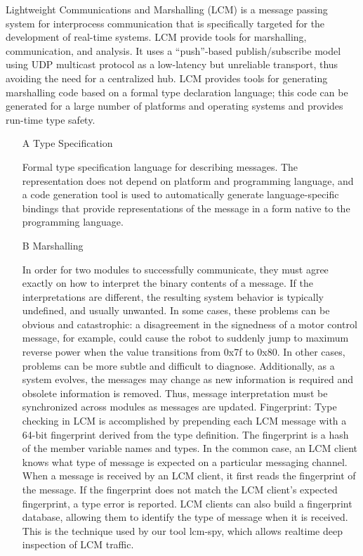 Lightweight Communications and Marshalling (LCM) is a message passing system for interprocess communication that is specifically targeted for the development of real-time systems. LCM provide tools for marshalling, communication, and analysis. It uses a “push”-based publish/subscribe model using UDP multicast protocol as a low-latency but unreliable transport, thus avoiding the need for a centralized hub. LCM provides tools for generating marshalling code based on a formal type declaration language; this code can be generated for a large number of platforms and operating systems and provides run-time type safety.
	\begin{itemize}
	
	\item[A] Type Specification
	
	Formal type specification language for describing messages.
	The representation does not depend on platform and programming language, and a code generation tool is used to automatically generate language-specific bindings that provide representations of the message in a form native to the programming language. 

	
	\item[B] Marshalling
	
	In order for two modules to successfully communicate, they must agree exactly on how to interpret the binary contents of a message. If the interpretations are different, the resulting system behavior is typically undefined, and usually unwanted. In some cases, these problems can be obvious and catastrophic: a disagreement in the signedness of a motor control message, for example, could cause the robot to suddenly jump to maximum reverse power when the value transitions from 0x7f to 0x80. In other cases, problems can be more subtle and difficult to diagnose. Additionally, as a system evolves, the messages may change as new information is required and obsolete information is removed. Thus, message interpretation must be synchronized across modules as messages are updated.
	Fingerprint: Type checking in LCM is accomplished by prepending each LCM message with a 64-bit fingerprint derived from the type definition. The fingerprint is a hash of the member variable names and types. 
	In the common case, an LCM client knows what type of message is expected on a particular messaging channel.
	When a message is received by an LCM client, it first reads the fingerprint of the message. If the fingerprint does not match the LCM client’s expected fingerprint, a type error is reported.
	LCM clients can also build a fingerprint database, allowing them to identify the type of message when it is received. This is the technique used by our tool lcm-spy, which allows realtime deep inspection of LCM traffic.
	

\end{itemize}
